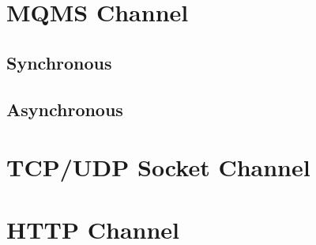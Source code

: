     

\section{MQMS Channel}
\subsection{Synchronous}
\subsection{Asynchronous}

\section{TCP/UDP Socket Channel}
\section{HTTP Channel}


